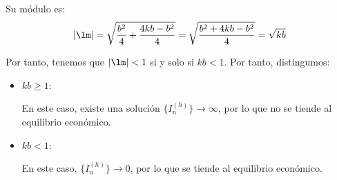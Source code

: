 \begin{ejercicio}
\begin{itemize}
        Su módulo es:
        \begin{equation*}
            |\lm| = \sqrt{\frac{b^2}{4}+\frac{4kb-b^2}{4}}
            = \sqrt{\frac{b^2+4kb-b^2}{4}}
            = \sqrt{kb}
        \end{equation*}

        Por tanto, tenemos que $|\lm|<1$ si y solo si $kb<1$. Por tanto, distingumos:
        \begin{itemize}
            \item \ul{$kb\geq 1$}:
            
            En este caso, existe una solución $\{I_n^{(h)}\}\to \infty$, por lo que no se tiende al equilibrio económico.

            \item \ul{$kb<1$}:
            
            En este caso, $\{I_n^{(h)}\}\to 0$, por lo que se tiende al equilibrio económico.
        \end{itemize}
    \end{itemize}    
\end{ejercicio}

